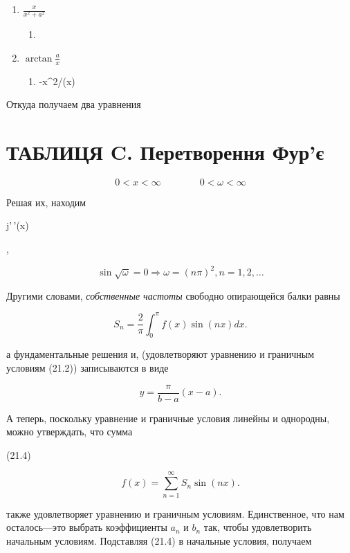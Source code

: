\documentclass[
  ukrainian,
]{article}
\providecommand{\tightlist}{%
  \setlength{\itemsep}{0pt}\setlength{\parskip}{0pt}}
\begin{document}
\begin{enumerate}
\def\labelenumi{\arabic{enumi}.}
\setcounter{enumi}{6}
\item
  \(\frac{x}{x^2+a^2}\)

  \begin{enumerate}
  \def\labelenumii{\arabic{enumii}.}
  \setcounter{enumii}{7}
  \item
  \end{enumerate}
\item
  \(\arctan \frac{a}{x}\)

  \begin{enumerate}
  \def\labelenumii{\arabic{enumii}.}
  \setcounter{enumii}{9}
  \tightlist
  \item
    -x\^{}2/(x)
  \end{enumerate}
\end{enumerate}

Откуда получаем два уравнения

\section{ТАБЛИЦЯ C. Перетворення
Фур'є}\label{ux442ux430ux431ux43bux438ux446ux44f-c.-ux43fux435ux440ux435ux442ux432ux43eux440ux435ux43dux43dux44f-ux444ux443ux440ux454}

\[
0 < x < \infty \qquad \qquad 0 < \omega < \infty
\]

Решая их, находим

j'\,'(x)

,

\[
\sin \sqrt{\omega} = 0 \Rightarrow \omega = (n\pi)^2 ,  n = 1, 2, \dots
\]

Другими словами, \emph{собственные частоты} свободно опирающейся балки
равны

\[
S_n = \frac{2}{\pi} \int_0^{\pi} f(x) \sin(nx) dx.
\]

а фундаментальные решения и, (удовлетворяют уравнению и граничным
условиям (21.2)) записываются в виде

\[
y = \frac{\pi}{b - a} (x - a).
\]

А теперь, поскольку уравнение и граничные условия линейны и однородны,
можно утверждать, что сумма

(21.4)

\[
f(x) = \sum_{n=1}^{\infty} S_n \sin(nx).
\]

также удовлетворяет уравнению и граничным условиям. Единственное, что
нам осталось---это выбрать коэффициенты \(a_n\) и \(b_n\) так, чтобы
удовлетворить начальным условиям. Подставляя (21.4) в начальные условия,
получаем
\end{document}

